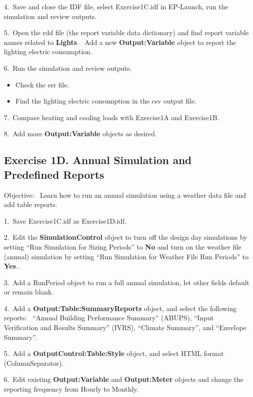 4.~Save and close the IDF file, select Exercise1C.idf in EP-Launch, run the simulation and review outputs.

5.~Open the rdd file (the report variable data dictionary) and find report variable names related to \textbf{Lights}.~ Add a new \textbf{Output:Variable} object to report the lighting electric consumption.

6.~Run the simulation and review outputs.

\begin{itemize}
\item
  Check the err file.
\item
  Find the lighting electric consumption in the csv output file.
\end{itemize}

7.~Compare heating and cooling loads with Exercise1A and Exercise1B.

8.~Add more \textbf{Output:Variable} objects as desired.

\subsection{Exercise 1D. Annual Simulation and Predefined Reports}\label{exercise-1d.-annual-simulation-and-predefined-reports}

Objective:~ Learn how to run an annual simulation using a weather data file and add table reports.

1.~Save Exercise1C.idf as Exercise1D.idf.

2.~Edit the \textbf{SimulationControl} object to turn off the design day simulations by setting ``Run Simulation for Sizing Periods'' to \textbf{No} and turn on the weather file (annual) simulation by setting ``Run Simulation for Weather File Run Periods'' to \textbf{Yes}..

3.~Add a RunPeriod object to run a full annual simulation, let other fields default or remain blank.

4.~Add a \textbf{Output:Table:SummaryReports} object, and select the following reports:~ ``Annual Building Performance Summary'' (ABUPS), ``Input Verification and Results Summary'' (IVRS), ``Climate Summary'', and ``Envelope Summary''.

5.~Add a \textbf{OutputControl:Table:Style} object, and select HTML format (ColumnSeparator).

6.~Edit existing \textbf{Output:Variable} and \textbf{Output:Meter} objects and change the reporting frequency from Hourly to Monthly.

